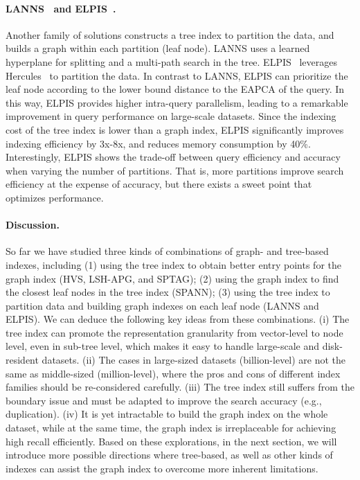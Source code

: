 \documentclass[11pt]{article}
\begin{document}
\paragraph{LANNS~\cite{lanns} and ELPIS~\cite{elpis}.}
Another family of solutions constructs a tree index to partition the data, and builds a graph within each partition (leaf node).
LANNS uses a learned hyperplane for splitting and a multi-path search in the tree.
ELPIS~\cite{elpis} leverages Hercules~\cite{hercules} to partition the data.
In contrast to LANNS, ELPIS can prioritize the leaf node according to the lower bound distance to the EAPCA of the query.
In this way, ELPIS provides higher intra-query parallelism, leading to a remarkable improvement in query performance on large-scale datasets.
Since the indexing cost of the tree index is lower than a graph index, ELPIS significantly improves indexing efficiency by 3x-8x, and reduces memory consumption by 40\%.
Interestingly, ELPIS shows the trade-off between query efficiency and accuracy when varying the number of partitions.
That is, more partitions improve search efficiency at the expense of accuracy, but there exists a sweet point that optimizes performance.

\paragraph{Discussion.}
So far we have studied three kinds of combinations of graph- and tree-based indexes, including
(1) using the tree index to obtain better entry points for the graph index (HVS, LSH-APG, and SPTAG);
(2) using the graph index to find the closest leaf nodes in the tree index (SPANN);
(3) using the tree index to partition data and building graph indexes on each leaf node (LANNS and ELPIS).
We can deduce the following key ideas from these combinations. 
(i) The tree index can promote the representation granularity from vector-level to node level, even in sub-tree level, which makes it easy to handle large-scale and disk-resident datasets.
(ii) The cases in large-sized datasets (billion-level) are not the same as middle-sized (million-level), where the pros and cons of different index families should be re-considered carefully. 
(iii) The tree index still suffers from the boundary issue and must be adapted to improve the search accuracy (e.g., duplication). 
(iv) It is yet intractable to build the graph index on the whole dataset, while at the same time, the graph index is irreplaceable for achieving high recall efficiently.
Based on these explorations, in the next section, we will introduce more possible directions where tree-based, as well as other kinds of indexes can assist the graph index to overcome more inherent limitations.
\end{document}
